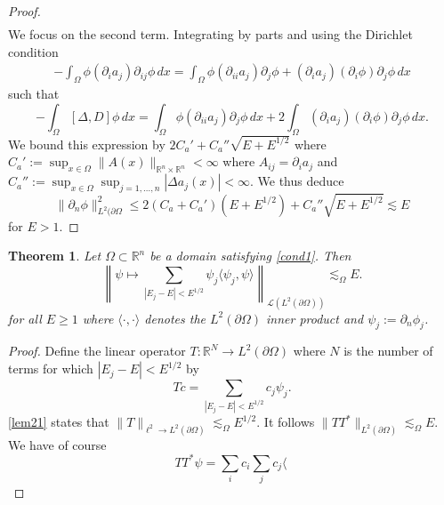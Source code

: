 \documentclass{article}
\newcommand{\R}{\mathbb{R}}
\newtheorem{thm}{Theorem}\newcommand{\thmautorefname}{Theorem}
\begin{document}
\begin{proof}
\begin{align*}
\end{align*}
We focus on the second term. Integrating by parts and using the Dirichlet condition
\begin{align*}
- \int_{\Omega} \phi (\partial_i a_j) \partial_{ij} \phi \, dx = \int_{\Omega} \phi (\partial_{ii} a_j)\partial_j \phi + (\partial_i a_j)(\partial_i \phi)\partial_j \phi \, dx
\end{align*}
such that
\begin{equation}
\label{eq-28}
- \int_{\Omega} [\Delta, D] \phi \, dx = \int_{\Omega} \phi (\partial_{ii} a_j)\partial_j \phi \, dx + 2 \int_{\Omega} (\partial_i a_j)(\partial_i \phi)\partial_j \phi \, dx.
\end{equation}
We bound this expression by $2 C_a' + C_a'' \sqrt{E + E^{1/2}}$ where $C_a' := \sup_{x \in \Omega} \lVert A(x) \rVert_{\R^n \times \R^n} < \infty$ where $A_{ij} = \partial_i a_j$ and $C_a'' := \sup_{x \in \Omega} \sup_{j=1,\dots,n} |\Delta a_j (x)| < \infty$.
We thus deduce
\[
\lVert \partial_n \phi \rVert_{L^2(\partial \Omega}^2 \le 2 (C_a + C_a') (E + E^{1/2}) + C_a'' \sqrt{E + E^{1/2}} \lesssim E
\]
for $E > 1$.
\end{proof}
\begin{thm}
Let $\Omega \subset \R^n$ be a domain satisfying \autoref{cond1}. Then
\[
\left\lVert \psi \mapsto \sum_{|E_j - E| < E^{1/2}} \psi_j \langle \psi_j, \psi \rangle \right\rVert_{\mathcal{L}(L^2(\partial \Omega))} \lesssim_\Omega E.
\]
for all $E \ge 1$ where $\langle \cdot, \cdot \rangle$ denotes the $L^2(\partial \Omega)$ inner product and $\psi_j := \partial_n \phi_j$.
\end{thm}
\begin{proof}
Define the linear operator $T : \R^N \to L^2(\partial \Omega)$ where $N$ is the number of terms for which $|E_j - E| < E^{1/2}$ by
\[
T c = \sum_{|E_j - E| < E^{1/2}} c_j \psi_j.
\]
\autoref{lem21} states that $\lVert T \rVert_{\ell^2 \to L^2(\partial \Omega)} \lesssim_\Omega E^{1/2}$.
It follows $\lVert T T^* \rVert_{L^2(\partial \Omega)} \lesssim_\Omega E$.
We have of course
\[
T T^* \psi =  \sum_{i} c_i \sum_{j} c_j \langle \
\]
\end{proof}
\end{document}
